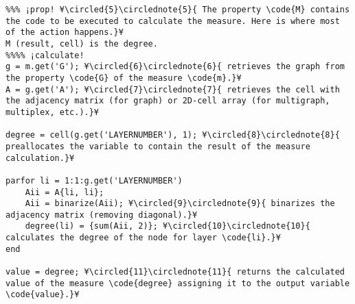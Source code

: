 \documentclass{tufte-handout}
\begin{document}
\begin{lstlisting}
%%% ¡prop! ¥\circled{5}\circlednote{5}{ The property \code{M} contains the code to be executed to calculate the measure. Here is where most of the action happens.}¥
M (result, cell) is the degree.
%%%% ¡calculate!
g = m.get('G'); ¥\circled{6}\circlednote{6}{ retrieves the graph from the property \code{G} of the measure \code{m}.}¥
A = g.get('A'); ¥\circled{7}\circlednote{7}{ retrieves the cell with the adjacency matrix (for graph) or 2D-cell array (for multigraph, multiplex, etc.).}¥

degree = cell(g.get('LAYERNUMBER'), 1); ¥\circled{8}\circlednote{8}{ preallocates the variable to contain the result of the measure calculation.}¥

parfor li = 1:1:g.get('LAYERNUMBER')
    Aii = A{li, li};
    Aii = binarize(Aii); ¥\circled{9}\circlednote{9}{ binarizes the adjacency matrix (removing diagonal).}¥
    degree(li) = {sum(Aii, 2)}; ¥\circled{10}\circlednote{10}{ calculates the degree of the node for layer \code{li}.}¥
end

value = degree; ¥\circled{11}\circlednote{11}{ returns the calculated value of the measure \code{degree} assigning it to the output variable \code{value}.}¥
\end{lstlisting}
\end{document}
